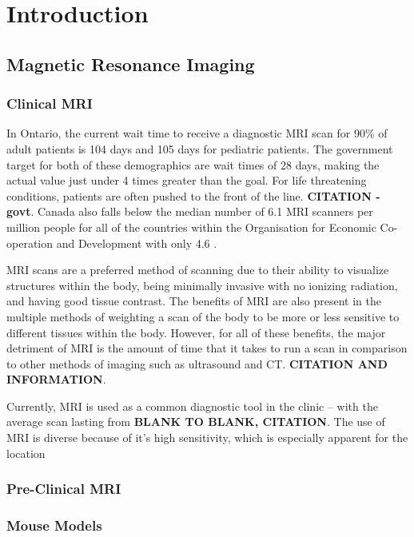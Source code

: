 \chapter{Introduction}

    \section{Magnetic Resonance Imaging}
    
        \subsection{Clinical MRI}
            
            In Ontario, the current wait time to receive a diagnostic MRI scan for 90\% of adult patients is 104 days and 105 days for pediatric patients. The government target for both of these demographics are wait times of 28 days, making the actual value just under 4 times greater than the goal. For life threatening conditions, patients are often pushed to the front of the line. \textbf{CITATION - govt}. Canada also falls below the median number of 6.1 MRI scanners per million people for all of the countries within the Organisation for Economic Co-operation and Development with only 4.6 \cite{Emery09,Stein05}.
            
            MRI scans are a preferred method of scanning due to their ability to visualize structures within the body, being minimally invasive with no ionizing radiation, and having good tissue contrast. The benefits of MRI are also present in the multiple methods of weighting a scan of the body to be more or less sensitive to different tissues within the body. However, for all of these benefits, the major detriment of MRI is the amount of time that it takes to run a scan in comparison to other methods of imaging such as ultrasound and CT. \textbf{CITATION AND INFORMATION}.
    
            Currently, MRI is used as a common diagnostic tool in the clinic -- with the average scan lasting from \textbf{BLANK TO BLANK, CITATION}. The use of MRI is diverse because of it's high sensitivity, which is especially apparent for the location 
            
            
        \subsection{Pre-Clinical MRI}
        
        \subsection{Mouse Models}
        
